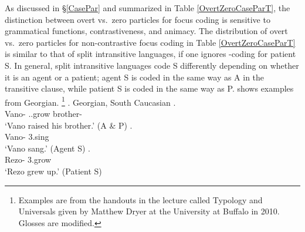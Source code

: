As discussed in \S \ref{CasePar} and summarized in Table \ref{OvertZeroCaseParT},
the distinction between overt vs.\ zero particles for focus coding is sensitive to grammatical functions, contrastiveness, and animacy.
The distribution of overt vs.\ zero particles for non-contrastive focus coding in Table \ref{OvertZeroCaseParT}
is similar to that of split intransitive languages,
if one ignores -coding for patient S.
In general, split intransitive languages code S differently
depending on whether it is an agent or a patient;
agent S is coded in the same way as A in the transitive clause,
while patient S is coded in the same way as P.
\Next shows examples from Georgian.%
	\footnote{
	Examples are from the handouts in the lecture called Typology and Universals given by Matthew Dryer at the University at Buffalo in 2010.
	Glosses are modified.
	}
\ex. Georgian, South Caucasian
	\ag.    \\
		Vano- \ab{3}..grow brother- \\
		`Vano raised his brother.' \hfill{(A \& P)}
	\bg.   \\
		Vano- 3.sing \\
		`Vano sang.' \hfill{(Agent S)}
	\bg.   \\
		Rezo- 3.grow \\
		`Rezo grew up.' \hfill{(Patient S)}
%

